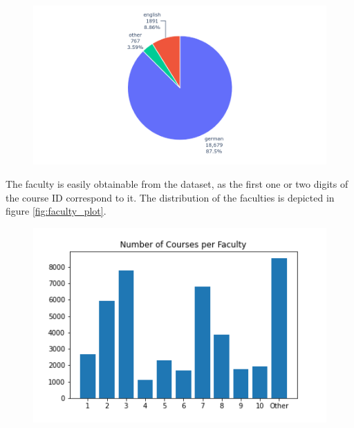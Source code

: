 \begin{figure}[H]
	\centering
	\includegraphics[width=\figwidth]{graphics/figures/courses_language_distribution.png}
\end{figure}


The faculty is easily obtainable from the dataset, as the first one or two digits of the course ID correspond to it. The distribution of the faculties is depicted in figure \ref{fig:faculty_plot}.

\begin{figure}[H]
	\centering
	\includegraphics[width=\figwidth]{graphics/figures/faculty_plot.png}
\end{figure}

